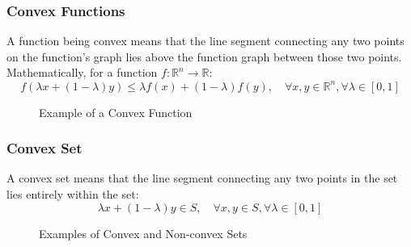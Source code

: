 \subsubsection{Convex Functions}
A function being convex means that the line segment connecting any two points on the function's graph lies above the function graph between those two points. Mathematically, for a function $f: \mathbb{R}^n \rightarrow \mathbb{R}$:
\begin{equation}
f(\lambda x + (1-\lambda)y) \leq \lambda f(x) + (1-\lambda) f(y), \quad \forall x,y \in \mathbb{R}^n, \forall \lambda \in [0,1]
\end{equation}

\begin{figure}[H]
    \centering
    \caption{Example of a Convex Function}
    \label{fig:convex_function}
\end{figure}

\subsubsection{Convex Set}
A convex set means that the line segment connecting any two points in the set lies entirely within the set:
\begin{equation}
\lambda x + (1-\lambda)y \in S, \quad \forall x,y \in S, \forall \lambda \in [0,1]
\end{equation}

\begin{figure}[H]
    \centering
    \caption{Examples of Convex and Non-convex Sets}
    \label{fig:convex_nonconvex_sets}
\end{figure}

